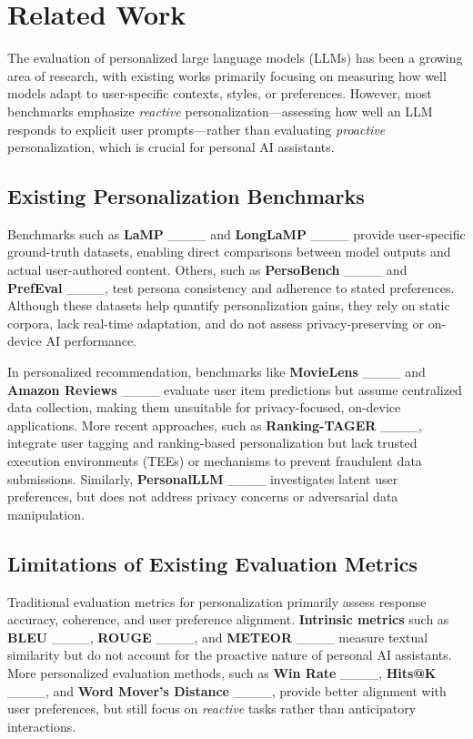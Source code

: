 \section{Related Work}
\label{sec:related_work}  

The evaluation of personalized large language models (LLMs) has been a growing area of research, with existing works primarily focusing on measuring how well models adapt to user-specific contexts, styles, or preferences. However, most benchmarks emphasize \emph{reactive} personalization—assessing how well an LLM responds to explicit user prompts—rather than evaluating \emph{proactive} personalization, which is crucial for personal AI assistants.

\subsection{Existing Personalization Benchmarks}

Benchmarks such as \textbf{LaMP} ____ and \textbf{LongLaMP} ____ provide user-specific ground-truth datasets, enabling direct comparisons between model outputs and actual user-authored content. Others, such as \textbf{PersoBench} ____ and \textbf{PrefEval} ____, test persona consistency and adherence to stated preferences. Although these datasets help quantify personalization gains, they rely on static corpora, lack real-time adaptation, and do not assess privacy-preserving or on-device AI performance.

In personalized recommendation, benchmarks like \textbf{MovieLens} ____ and \textbf{Amazon Reviews} ____ evaluate user item predictions but assume centralized data collection, making them unsuitable for privacy-focused, on-device applications. More recent approaches, such as \textbf{Ranking-TAGER} ____, integrate user tagging and ranking-based personalization but lack trusted execution environments (TEEs) or mechanisms to prevent fraudulent data submissions. Similarly, \textbf{PersonalLLM} ____ investigates latent user preferences, but does not address privacy concerns or adversarial data manipulation.

\subsection{Limitations of Existing Evaluation Metrics}

Traditional evaluation metrics for personalization primarily assess response accuracy, coherence, and user preference alignment. \textbf{Intrinsic metrics} such as \textbf{BLEU} ____, \textbf{ROUGE} ____, and \textbf{METEOR} ____ measure textual similarity but do not account for the proactive nature of personal AI assistants. More personalized evaluation methods, such as \textbf{Win Rate} ____, \textbf{Hits@K} ____, and \textbf{Word Mover’s Distance} ____, provide better alignment with user preferences, but still focus on \emph{reactive} tasks rather than anticipatory interactions.


